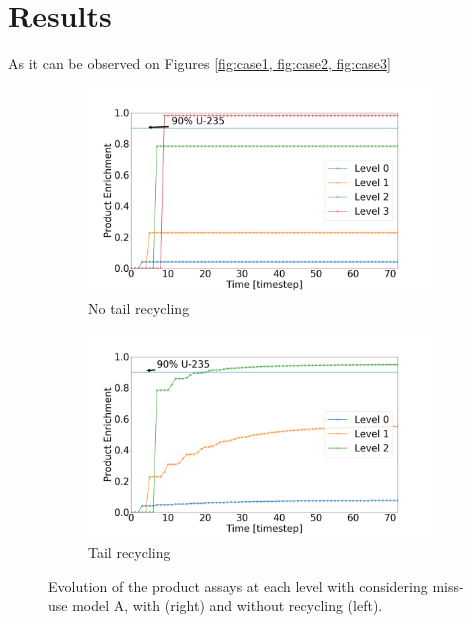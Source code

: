 \section{Results}
As it can be observed on Figures \ref{fig:case1, fig:case2, fig:case3} 
\begin{figure}[t!]
    \centering
    \begin{subfigure}[t]{0.45\textwidth}
        \centering
        \includegraphics[scale=0.18]{NR_case1}
        \caption{No tail recycling}
    \end{subfigure}%
    \begin{subfigure}[t]{0.45\textwidth}
        \centering
        \includegraphics[scale=0.18]{R_case1}
        \caption{Tail recycling}
    \end{subfigure}
    \caption{Evolution of the product assays at each level with considering
    miss-use model A, with (right) and without recycling (left).}
    \label{fig:case1}
\end{figure}
